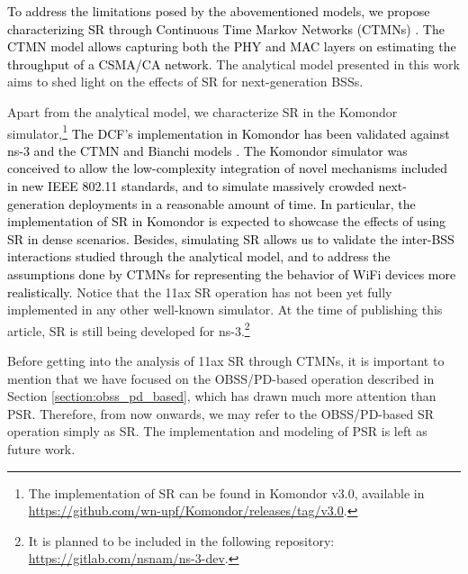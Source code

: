 \documentclass{ieeeaccess}
\begin{document}
\textcolor{black}{To address the limitations posed by the abovementioned models, we propose characterizing SR through Continuous Time Markov Networks (CTMNs) \cite{bellalta2014throughput, bellalta2017throughput}. The CTMN model allows capturing both the PHY and MAC layers on estimating the throughput of a CSMA/CA network.} The analytical model presented in this work aims to shed light on the effects of SR for next-generation BSSs.

Apart from the analytical model, we characterize SR in the Komondor simulator,\footnote{The implementation of SR can be found in Komondor v3.0, available in \url{https://github.com/wn-upf/Komondor/releases/tag/v3.0}.} \textcolor{black}{The DCF's implementation in Komondor has been validated against ns-3 and the CTMN and Bianchi models \cite{barrachina2019komondor}. The Komondor simulator was conceived to allow the low-complexity integration of novel mechanisms included in new IEEE 802.11 standards, and to simulate massively crowded next-generation deployments in a reasonable amount of time. In particular, the implementation of SR in Komondor is expected to showcase the effects of using SR in dense scenarios. Besides, simulating SR allows us to validate the inter-BSS interactions studied through the analytical model, and to address the assumptions done by CTMNs for representing the behavior of WiFi devices more realistically.} Notice that the 11ax SR operation has not been yet fully implemented in any other well-known simulator. At the time of publishing this article, SR is still being developed for ns-3.\footnote{It is planned to be included in the following repository: \url{https://gitlab.com/nsnam/ns-3-dev}.}

Before getting into the analysis of 11ax SR through CTMNs, it is important to mention that we have focused on the OBSS/PD-based operation described in Section \ref{section:obss_pd_based}, which has drawn much more attention than PSR. Therefore, from now onwards, we may refer to the OBSS/PD-based SR operation simply as SR. The implementation and modeling of PSR is left as future work.
\end{document}
